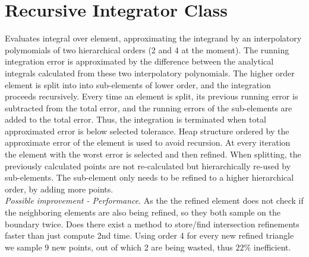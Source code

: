 \section{Recursive Integrator Class}
\label{interface-integrator-recursive}

Evaluates integral over element, approximating the integrand by an interpolatory polymomials of two hierarchical orders (2 and 4 at the moment). The running integration error is approximated by the difference between the analytical integrals calculated from these two interpolatory polynomials. The higher order element is split into into sub-elements of lower order, and the integration proceeds recursively. Every time an element is split, its previous running error is subtracted from the total error, and the running errors of the sub-elements are added to the total error. Thus, the integration is terminated when total approximated error is below selected tolerance. Heap structure ordered by the approximate error of the element is used to avoid recursion. At every iteration the element with the worst error is selected and then refined. When splitting, the previously calculated points are not re-calculated but hierarchically re-used by sub-elements. The sub-element only needs to be refined to a higher hierarchical order, by adding more points. \\

\noindent
\textit{Possible improvement - Performance}. As the the refined element does not check if the neighboring elements are also being refined, so they both sample on the boundary twice. Does there exist a method to store/find intersection refinements faster than just compute 2nd time. Using order 4 for every new refined triangle we sample 9 new points, out of which 2 are being wasted, thus $22\%$ inefficient.

